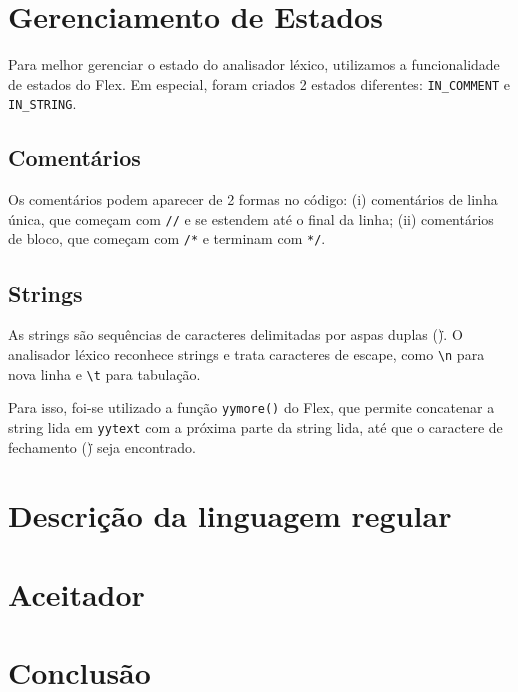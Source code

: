 \documentclass[12pt,a4paper]{article}
\begin{document}
\section{Gerenciamento de Estados}

Para melhor gerenciar o estado do analisador léxico, utilizamos a funcionalidade de estados do Flex. Em especial, foram criados 2 estados diferentes: \texttt{IN\_COMMENT} e \texttt{IN\_STRING}. 

\subsection{Comentários}
Os comentários podem aparecer de 2 formas no código: (i) comentários de linha única, que começam com \texttt{//} e se estendem até o final da linha; (ii) comentários de bloco, que começam com \texttt{/*} e terminam com \texttt{*/}.

\subsection{Strings}

As strings são sequências de caracteres delimitadas por aspas duplas (\texttt{\"}). O analisador léxico reconhece strings e trata caracteres de escape, como \texttt{\textbackslash n} para nova linha e \texttt{\textbackslash t} para tabulação.

Para isso, foi-se utilizado a função \texttt{yymore()} do Flex, que permite concatenar a string lida em \texttt{yytext} com a próxima parte da string lida, até que o caractere de fechamento (\texttt{\"}) seja encontrado.

\section{Descrição da linguagem regular}

\section{Aceitador}

\section{Conclusão}
\end{document}
